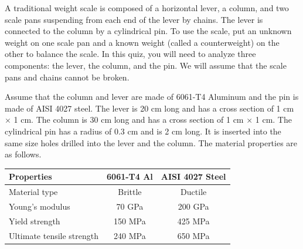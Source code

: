 \documentclass[
10pt,
a4paper,
openany,
svgnames,
]{book}
\begin{document}
A traditional weight scale is composed of a horizontal lever, a column, and two scale pans suspending from each end of the lever by chains. The lever is connected to the column by a cylindrical pin. To use the scale, put an unknown weight on one scale pan and a known weight (called a counterweight) on the other to balance the scale. In this quiz, you will need to analyze three components: the lever, the column, and the pin. We will assume that the scale pans and chains cannot be broken.

\begin{figure}[h]
  \centering
\end{figure}

Assume that the column and lever are made of 6061-T4 Aluminum and the pin is made of AISI 4027 steel. The lever is 20 cm long and has a cross section of 1 cm $\times$ 1 cm. The column is 30 cm long and has a cross section of 1 cm $\times$ 1 cm. The cylindrical pin has a radius of 0.3 cm and is 2 cm long. It is inserted into the same size holes drilled into the lever and the column. The material properties are as follows.
\begin{table}[h]
  \centering
    \begin{tabular}{ lcc }
      \toprule
      Properties & 6061-T4 Al & AISI 4027 Steel \\
      \midrule
      Material type & Brittle & Ductile \\
      Young’s modulus & 70 GPa & 200 GPa \\
      Yield strength & 150 MPa & 425 MPa \\
      Ultimate tensile strength & 240 MPa & 650 MPa \\
      \bottomrule
  \end{tabular}
\end{table}
\end{document}
